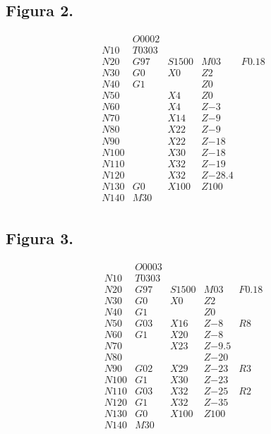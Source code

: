 \documentclass{article}
\begin{document}
\subsection{Figura 2.}
\begin{equation*}
    \begin{matrix}
           & O0002 \\ 
        N10 & T0303 \\
        N20 & G97 & S1500 & M03 & F0.18 \\
        N30 & G0 & X0 & Z2 \\ 
        N40 & G1 & & Z0 \\
        N50 & &  X4 & Z0 \\ 
        N60 & &  X4 & Z{-3} \\
        N70 & &  X14 & Z{-9} \\
        N80 & &  X22 & Z{-9} \\
        N90 & &  X22 & Z{-18} \\
        N100 & & X30 & Z{-18} \\
        N110 & & X32 & Z{-19} \\
        N120 & & X32 & Z{-28.4} \\
        N130 & G0 & X100 & Z100 \\
        N140 & M30 \\
    \end{matrix}
\end{equation*}

\subsection{Figura 3.}
\begin{equation*}
    \begin{matrix}
        & O0003 \\ 
        N10 & T0303 \\
        N20 & G97 & S1500 & M03 & F0.18 \\
        N30 & G0 & X0 & Z2 \\ 
        N40 & G1 & & Z0 \\
        N50 & G03 & X16 & Z{-8} & R8 \\ 
        N60 & G1 & X20 & Z{-8} \\
        N70 & & X23 & Z{-9.5} \\
        N80 & & & Z{-20} \\
        N90 & G02 & X29 & Z{-23} & R3 \\
        N100 & G1 & X30 & Z{-23} \\
        N110 & G03 & X32 & Z{-25} & R2\\
        N120 & G1 & X32 & Z{-35} \\
        N130 & G0 & X100 & Z100 \\
        N140 & M30 \\
    \end{matrix}
\end{equation*}
\end{document}
